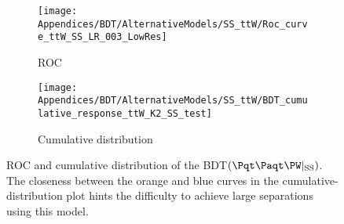 \begin{figure}[h]
\centering
\begin{subfigure}{.475\textwidth}
  \centering
  \texttt{[image: Appendices/BDT/AlternativeModels/SS\_ttW/Roc\_curve\_ttW\_SS\_LR\_003\_LowRes]}
  \caption{ROC}
  \label{fig:BDT:AltModels:ttWSS:ROC}
\end{subfigure}%
\begin{subfigure}{.5\textwidth}
  \centering
  \texttt{[image: Appendices/BDT/AlternativeModels/SS\_ttW/BDT\_cumulative\_response\_ttW\_K2\_SS\_test]}
  \caption{Cumulative distribution}
  \label{fig:BDT:AltModels:ttWSS:Score}
\end{subfigure}
\caption{ROC and cumulative distribution of the BDT$(\ttW|_{\text{SS}})$.
The closeness between the orange and blue curves in the cumulative-distribution plot hints
the difficulty to achieve large separations using this model.}
\label{fig:BDT:AltModels:Result:ttWSS}
\end{figure}



